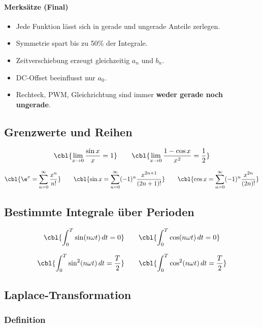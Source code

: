 \paragraph{Merksätze (Final)}

\begin{itemize}
    \item Jede Funktion lässt sich in gerade und ungerade Anteile zerlegen.
    \item Symmetrie spart bis zu 50\% der Integrale.
    \item Zeitverschiebung erzeugt gleichzeitig $a_n$ und $b_n$.
    \item DC-Offset beeinflusst nur $a_0$.
    \item Rechteck, PWM, Gleichrichtung sind immer \textbf{weder gerade noch ungerade}.
\end{itemize}


\subsection{Grenzwerte und Reihen}

\[
\cbl{\lim_{x \to 0} \frac{\sin x}{x} = 1}
\qquad
\cbl{\lim_{x \to 0} \frac{1 - \cos x}{x^2} = \frac{1}{2}}
\]

\[
\cbl{\e^{x} = \sum_{n=0}^{\infty} \frac{x^n}{n!}}
\qquad
\cbl{\sin x = \sum_{n=0}^{\infty} (-1)^n \frac{x^{2n+1}}{(2n+1)!}}
\qquad
\cbl{\cos x = \sum_{n=0}^{\infty} (-1)^n \frac{x^{2n}}{(2n)!}}
\]

\subsection{Bestimmte Integrale über Perioden}

\[
\cbl{\int_0^T \sin(n \omega t)\,dt = 0}
\qquad
\cbl{\int_0^T \cos(n \omega t)\,dt = 0}
\]

\[
\cbl{\int_0^T \sin^2(n \omega t)\,dt = \frac{T}{2}}
\qquad
\cbl{\int_0^T \cos^2(n \omega t)\,dt = \frac{T}{2}}
\]

\subsection{Laplace-Transformation}

\subsubsection{Definition}

